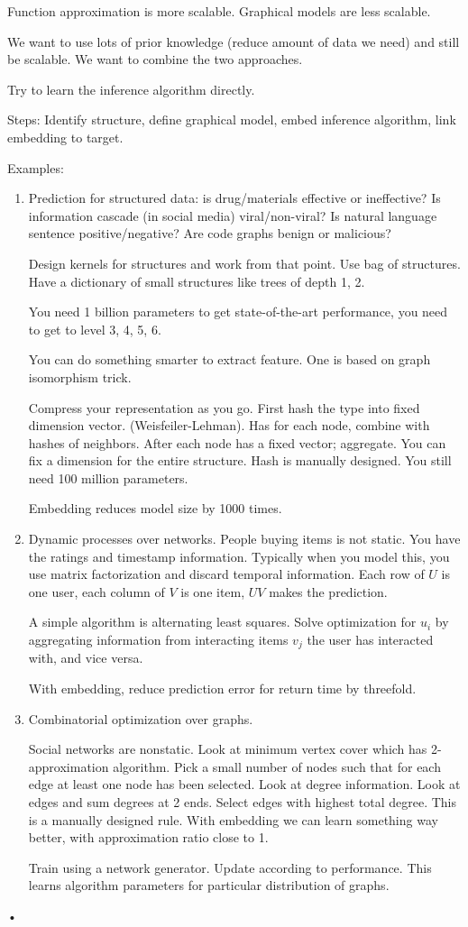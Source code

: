 Function approximation is more scalable. Graphical models are less scalable. 

We want to use lots of prior knowledge (reduce amount of data we need) and still be scalable. We want to combine the two approaches.

Try to learn the inference algorithm directly. 

Steps: 
Identify structure, define graphical model, embed inference algorithm, link embedding to target.

Examples:
\begin{enumerate}
\item
Prediction for structured data: is drug/materials effective or ineffective? Is information cascade (in social media) viral/non-viral? Is natural language sentence positive/negative?
Are code graphs benign or malicious?

Design kernels for structures and work from that point. Use bag of structures. Have a dictionary of small structures like trees of depth 1, 2. 

You need 1 billion parameters to get state-of-the-art performance, you need to get to level 3, 4, 5, 6.

You can do something smarter to extract feature. One is based on graph isomorphism trick. 

Compress your representation as you go. First hash the type into fixed dimension vector. (Weisfeiler-Lehman). Has for each node, combine with hashes of neighbors. After each node has a fixed vector; aggregate. You can fix a dimension for the entire structure. Hash is manually designed. You still need 100 million parameters. 

Embedding reduces model size by 1000 times. 
\item
Dynamic processes over networks. People buying items is not static. You have the ratings and timestamp information. Typically when you model this, you use matrix  factorization and discard temporal information. %
Each row of $U$ is one user, each column of $V$ is one item, $UV$ makes the prediction.

A simple algorithm is alternating least squares. Solve optimization for $u_i$ by aggregating information from interacting items $v_j$ the user has interacted with, and vice versa. 

With embedding, reduce prediction error for return time by threefold.
\item
Combinatorial optimization over graphs.

 Social networks are nonstatic. 
 Look at minimum vertex cover which has 2-approximation algorithm. Pick a small number of nodes such that for each edge at least one node has been selected. Look at degree information. Look at edges and sum degrees at 2 ends. Select edges with highest total degree.
This is a manually designed rule.
With embedding we can learn something way better, with approximation ratio close to 1. 

Train using a network generator. Update according to performance. %
This learns algorithm parameters for particular distribution of graphs.
\end{enumerate}•
